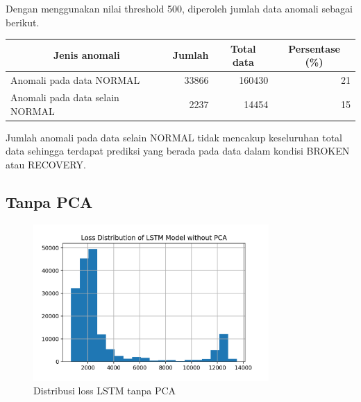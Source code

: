     Dengan menggunakan nilai threshold 500, diperoleh jumlah data anomali sebagai berikut.

    \begin{table}[h]
        \centering
        \begin{tabular}{|l|r|r|r|}
            \hline
            \multicolumn{1}{|c|}{\textbf{Jenis anomali}} & \multicolumn{1}{c|}{\textbf{Jumlah}} & \multicolumn{1}{c|}{\textbf{Total data}} & \multicolumn{1}{c|}{\textbf{Persentase (\%)}} \\ \hline
            Anomali pada data NORMAL                     & 33866                                & 160430                                   & 21                                       \\ \hline
            Anomali pada data selain NORMAL              & 2237                                 & 14454                                    & 15                                       \\ \hline
        \end{tabular}
    \end{table}

    Jumlah anomali pada data selain NORMAL tidak mencakup keseluruhan total data sehingga terdapat prediksi yang berada pada data dalam kondisi BROKEN atau RECOVERY.

    \subsection{Tanpa PCA}

    \begin{figure}[h]
        \centering
        \includegraphics[width=0.8\textwidth]{resources/LSTM/LSTM_noPCA_LossDist.png}
        \caption{Distribusi loss LSTM tanpa PCA}
    \end{figure}

